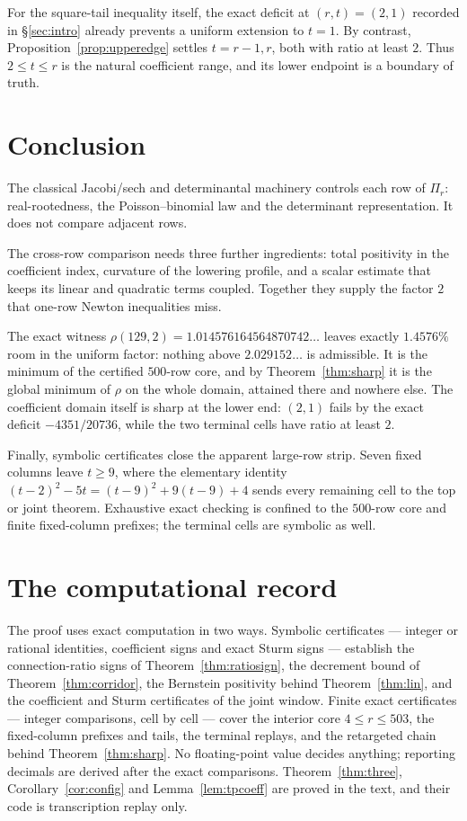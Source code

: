 \documentclass[11pt,a4paper]{article}
\theoremstyle{plain}
\theoremstyle{definition}
\theoremstyle{remark}
\begin{document}
For the square-tail inequality itself, the exact deficit at $(r,t)=(2,1)$
recorded in \S\ref{sec:intro} already prevents a uniform extension to $t=1$.
By contrast, Proposition~\ref{prop:upperedge} settles $t=r-1,r$, both with
ratio at least $2$. Thus $2\le t\le r$ is the natural coefficient range, and
its lower endpoint is a boundary of truth.

\section{Conclusion}\label{sec:concl}

The classical Jacobi/sech and determinantal machinery controls each row of
$\Pi_r$: real-rootedness, the Poisson--binomial law and the determinant
representation. It does not compare adjacent rows.

The cross-row comparison needs three further ingredients: total positivity in
the coefficient index, curvature of the lowering profile, and a scalar estimate
that keeps its linear and quadratic terms coupled. Together they supply the
factor $2$ that one-row Newton inequalities miss.

The exact witness $\rho(129,2)=1.014576164564870742\ldots$ leaves exactly
$1.4576\%$ room in the uniform factor: nothing above $2.029152\ldots$ is
admissible. It is the minimum of the certified $500$-row core, and by
Theorem~\ref{thm:sharp} it is the global minimum of $\rho$ on the whole
domain, attained there and nowhere else. The coefficient
domain itself is sharp at the lower end: $(2,1)$ fails by the exact deficit
$-4351/20736$, while the two terminal cells have ratio at least $2$.

Finally, symbolic certificates close the apparent large-row strip. Seven fixed
columns leave $t\ge9$, where the elementary identity
$(t-2)^2-5t=(t-9)^2+9(t-9)+4$ sends every remaining cell to the top or joint
theorem. Exhaustive exact checking is confined to the $500$-row core and finite
fixed-column prefixes; the terminal cells are symbolic as well.

\appendix

\section{The computational record}\label{sec:repro}

The proof uses exact computation in two ways. Symbolic certificates ---
integer or rational identities, coefficient signs and exact Sturm signs ---
establish the connection-ratio signs of Theorem~\ref{thm:ratiosign}, the
decrement bound of Theorem~\ref{thm:corridor}, the Bernstein positivity
behind Theorem~\ref{thm:lin}, and the coefficient and Sturm certificates of
the joint window. Finite exact certificates --- integer comparisons, cell by
cell --- cover the interior core $4\le r\le503$, the fixed-column prefixes
and tails, the terminal replays, and the retargeted chain behind
Theorem~\ref{thm:sharp}. No floating-point value decides anything; reporting
decimals are derived after the exact comparisons. Theorem~\ref{thm:three},
Corollary~\ref{cor:config} and Lemma~\ref{lem:tpcoeff} are proved in the
text, and their code is transcription replay only.
\end{document}
